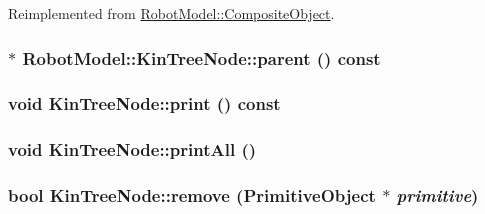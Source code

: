 Reimplemented from \hyperlink{class_robot_model_1_1_composite_object_a00db0d1a45893ef058e7abbad5083b6b}{RobotModel::CompositeObject}.\hypertarget{class_robot_model_1_1_kin_tree_node_a58fa5e8933de90d3f4896d39292baa39}{
\subsubsection[{parent}]{$\ast$ RobotModel::KinTreeNode::parent () const}}
\label{class_robot_model_1_1_kin_tree_node_a58fa5e8933de90d3f4896d39292baa39}
\hypertarget{class_robot_model_1_1_kin_tree_node_a788349199227101ec9e5a478842a1959}{
\subsubsection[{print}]{\setlength{\rightskip}{0pt plus 5cm}void KinTreeNode::print () const}}
\label{class_robot_model_1_1_kin_tree_node_a788349199227101ec9e5a478842a1959}
\hypertarget{class_robot_model_1_1_kin_tree_node_af682a96a09f754e0fb82066560538241}{
\subsubsection[{printAll}]{\setlength{\rightskip}{0pt plus 5cm}void KinTreeNode::printAll ()}}
\label{class_robot_model_1_1_kin_tree_node_af682a96a09f754e0fb82066560538241}
\hypertarget{class_robot_model_1_1_kin_tree_node_ac87cf9db956705dcee63f4dbc01cc664}{
\subsubsection[{remove}]{\setlength{\rightskip}{0pt plus 5cm}bool KinTreeNode::remove ({\bf PrimitiveObject} $\ast$ {\em primitive})}}
\label{class_robot_model_1_1_kin_tree_node_ac87cf9db956705dcee63f4dbc01cc664}


